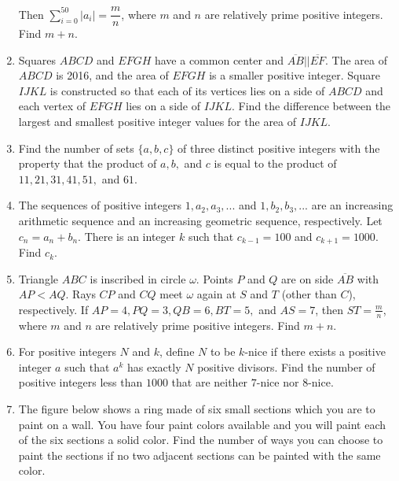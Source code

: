 \documentclass{article}
\begin{document}
\begin{enumerate}[label=\arabic*., itemsep=0.5em]
Then $\sum_{i=0}^{50} |a_i|=\dfrac{m}{n}$, where $m$ and $n$ are relatively prime positive integers. Find $m+n$.\par \vspace{0.5em}\item Squares $ABCD$ and $EFGH$ have a common center and $\overline{AB} || \overline{EF}$. The area of $ABCD$ is 2016, and the area of $EFGH$ is a smaller positive integer. Square $IJKL$ is constructed so that each of its vertices lies on a side of $ABCD$ and each vertex of $EFGH$ lies on a side of $IJKL$. Find the difference between the largest and smallest positive integer values for the area of $IJKL$.\par \vspace{0.5em}\item Find the number of sets $\{a,b,c\}$ of three distinct positive integers with the property that the product of $a,b,$ and $c$ is equal to the product of $11,21,31,41,51,$ and $61$.\par \vspace{0.5em}\item The sequences of positive integers $1,a_2, a_3,...$ and $1,b_2, b_3,...$ are an increasing arithmetic sequence and an increasing geometric sequence, respectively. Let $c_n=a_n+b_n$. There is an integer $k$ such that $c_{k-1}=100$ and $c_{k+1}=1000$. Find $c_k$.\par \vspace{0.5em}\item Triangle $ABC$ is inscribed in circle $\omega$. Points $P$ and $Q$ are on side $\overline{AB}$ with $AP<AQ$. Rays $CP$ and $CQ$ meet $\omega$ again at $S$ and $T$ (other than $C$), respectively. If $AP=4,PQ=3,QB=6,BT=5,$ and $AS=7$, then $ST=\frac{m}{n}$, where $m$ and $n$ are relatively prime positive integers. Find $m+n$.\par \vspace{0.5em}\item For positive integers $N$ and $k$, define $N$ to be $k$-nice if there exists a positive integer $a$ such that $a^{k}$ has exactly $N$ positive divisors. Find the number of positive integers less than $1000$ that are neither $7$-nice nor $8$-nice.\par \vspace{0.5em}\item The figure below shows a ring made of six small sections which you are to paint on a wall. You have four paint colors available and you will paint each of the six sections a solid color. Find the number of ways you can choose to paint the sections if no two adjacent sections can be painted with the same color.



\end{enumerate}
\end{document}
